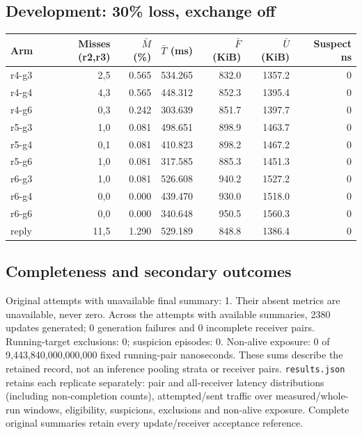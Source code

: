 \subsection*{Development: 30\% loss, exchange off}
\begin{center}\small
\begin{tabular}{lrrrrrr}
Arm & Misses (r2,r3) & $\bar M$ (\%) & $\bar T$ (ms) & $\bar F$ (KiB) & $\bar U$ (KiB) & Suspect ns \\ \hline
r4-g3 & 2,5 & 0.565 & 534.265 & 832.0 & 1357.2 & 0 \\
r4-g4 & 4,3 & 0.565 & 448.312 & 852.3 & 1395.4 & 0 \\
r4-g6 & 0,3 & 0.242 & 303.639 & 851.7 & 1397.7 & 0 \\
r5-g3 & 1,0 & 0.081 & 498.651 & 898.9 & 1463.7 & 0 \\
r5-g4 & 0,1 & 0.081 & 410.823 & 898.2 & 1467.2 & 0 \\
r5-g6 & 1,0 & 0.081 & 317.585 & 885.3 & 1451.3 & 0 \\
r6-g3 & 1,0 & 0.081 & 526.608 & 940.2 & 1527.2 & 0 \\
r6-g4 & 0,0 & 0.000 & 439.470 & 930.0 & 1518.0 & 0 \\
r6-g6 & 0,0 & 0.000 & 340.648 & 950.5 & 1560.3 & 0 \\
reply & 11,5 & 1.290 & 529.189 & 848.8 & 1386.4 & 0 \\
\end{tabular}\end{center}
\subsection*{Completeness and secondary outcomes}
Original attempts with unavailable final summary: 1. Their absent metrics are unavailable, never zero. 
Across the attempts with available summaries, 2380 updates generated; 0 generation failures and 0 incomplete receiver pairs. Running-target exclusions: 0; suspicion episodes: 0. Non-alive exposure: 0 of 9,443,840,000,000,000 fixed running-pair nanoseconds. These sums describe the retained record, not an inference pooling strata or receiver pairs. \texttt{results.json} retains each replicate separately: pair and all-receiver latency distributions (including non-completion counts), attempted/sent traffic over measured/whole-run windows, eligibility, suspicions, exclusions and non-alive exposure. Complete original summaries retain every update/receiver acceptance reference.
